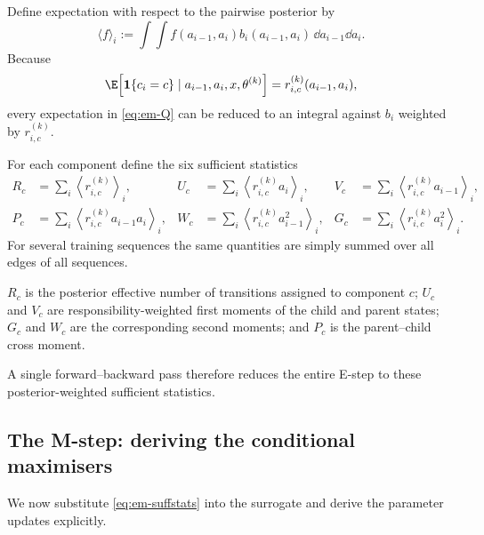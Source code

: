 Define expectation with respect to the pairwise posterior by
\begin{equation}
  \langle f\rangle_i
  :=
  \int\!\!\int
  f(a_{i-1},a_i)
  b_i(a_{i-1},a_i)
  \,\dd a_{i-1}\dd a_i.
  \label{eq:em-bracket}
\end{equation}
Because
\begin{equation}
  \E\!\left[
    \mathbf 1\{c_i=c\}
    \mid a_{i-1},a_i,x,\theta^{(k)}
  \right]
  =
  r_{i,c}^{(k)}(a_{i-1},a_i),
  \label{eq:em-indicator-responsibility}
\end{equation}
every expectation in \eqref{eq:em-Q} can be reduced to an integral against
$b_i$ weighted by $r_{i,c}^{(k)}$.

For each component define the six sufficient statistics
\begin{equation}
  \begin{aligned}
    R_c
    &=
    \sum_i
    \left\langle r_{i,c}^{(k)}\right\rangle_i,
    &
    U_c
    &=
    \sum_i
    \left\langle
      r_{i,c}^{(k)}a_i
    \right\rangle_i,
    &
    V_c
    &=
    \sum_i
    \left\langle
      r_{i,c}^{(k)}a_{i-1}
    \right\rangle_i,
    \\[1mm]
    P_c
    &=
    \sum_i
    \left\langle
      r_{i,c}^{(k)}a_{i-1}a_i
    \right\rangle_i,
    &
    W_c
    &=
    \sum_i
    \left\langle
      r_{i,c}^{(k)}a_{i-1}^2
    \right\rangle_i,
    &
    G_c
    &=
    \sum_i
    \left\langle
      r_{i,c}^{(k)}a_i^2
    \right\rangle_i.
  \end{aligned}
  \label{eq:em-suffstats}
\end{equation}
For several training sequences the same quantities are simply summed over
all edges of all sequences.

 $R_c$ is the posterior effective
number of transitions assigned to component $c$; $U_c$ and $V_c$ are
responsibility-weighted first moments of the child and parent states;
$G_c$ and $W_c$ are the corresponding second moments; and $P_c$ is the
parent--child cross moment.

A single forward--backward pass therefore reduces the entire E-step to these
posterior-weighted sufficient statistics.

\subsection{The M-step: deriving the conditional maximisers}

We now substitute \eqref{eq:em-suffstats} into the surrogate and derive the
parameter updates explicitly.

